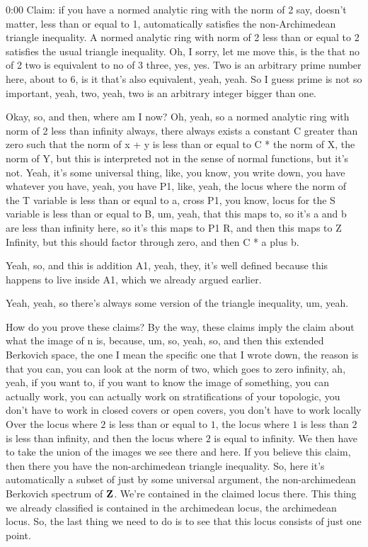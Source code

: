 \begin{unfinished}{0:00}
Claim: if you have a normed analytic ring with the norm of 2 say, doesn't matter, less than or equal to 1, automatically satisfies the non-Archimedean triangle inequality. A normed analytic ring with norm of 2 less than or equal to 2 satisfies the usual triangle inequality. Oh, I sorry, let me move this, is the that no of 2 two is equivalent to no of 3 three, yes, yes. Two is an arbitrary prime number here, about to 6, is it that's also equivalent, yeah, yeah. So I guess prime is not so important, yeah, two, yeah, two is an arbitrary integer bigger than one.

Okay, so, and then, where am I now? Oh, yeah, so a normed analytic ring with norm of 2 less than infinity always, there always exists a constant C greater than zero such that the norm of x + y is less than or equal to C * the norm of X, the norm of Y, but this is interpreted not in the sense of normal functions, but it's not. Yeah, it's some universal thing, like, you know, you write down, you have whatever you have, yeah, you have P1, like, yeah, the locus where the norm of the T variable is less than or equal to a, cross P1, you know, locus for the S variable is less than or equal to B, um, yeah, that this maps to, so it's a and b are less than infinity here, so it's this maps to P1 R, and then this maps to Z Infinity, but this should factor through zero, and then C * a plus b.

Yeah, so, and this is addition A1, yeah, they, it's well defined because this happens to live inside A1, which we already argued earlier.

Yeah, yeah, so there's always some version of the triangle inequality, um, yeah.

How do you prove these claims? By the way, these claims imply the claim about what the image of n is, because, um, so, yeah, so, and then this extended Berkovich space, the one I mean the specific one that I wrote down, the reason is that you can, you can look at the norm of two, which goes to zero infinity, ah, yeah, if you want to, if you want to know the image of something, you can actually work, you can actually work on stratifications of your topologic, you don't have to work in closed covers or open covers, you don't have to work locally
Over the locus where $2$ is less than or equal to $1$, the locus where $1$ is less than $2$ is less than infinity, and then the locus where $2$ is equal to infinity. We then have to take the union of the images we see there and here. If you believe this claim, then there you have the non-archimedean triangle inequality. So, here it's automatically a subset of just by some universal argument, the non-archimedean Berkovich spectrum of $\mathbf Z$. We're contained in the claimed locus there. This thing we already classified is contained in the archimedean locus, the archimedean locus. So, the last thing we need to do is to see that this locus consists of just one point.


\end{unfinished}
